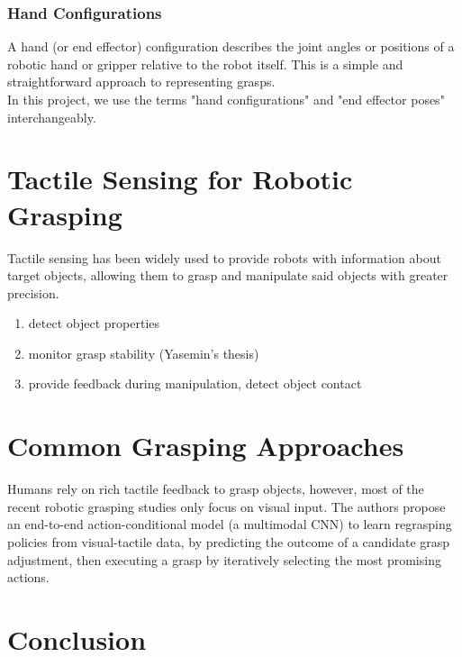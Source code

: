 \documentclass[11pt, a4paper]{report}
\begin{document}
\subsubsection{Hand Configurations}
\label{sec:2.1.1.3}
A hand (or end effector) configuration describes the joint angles or positions of a robotic hand or gripper relative to the robot itself. This is a simple and straightforward approach to representing grasps.\\

In this project, we use the terms "hand configurations" and "end effector poses" interchangeably.


\section{Tactile Sensing for Robotic Grasping}
\label{sec:2.2}
Tactile sensing has been widely used to provide robots with information about target objects, allowing them to grasp and manipulate said objects with greater precision.

\begin{enumerate}
    \item detect object properties
    \item monitor grasp stability (Yasemin's thesis)
    \item provide feedback during manipulation, detect object contact
\end{enumerate}


\section{Common Grasping Approaches}
\label{sec:2.3}
Humans rely on rich tactile feedback to grasp objects, however, most of the recent robotic grasping studies only focus on visual input. The authors propose an end-to-end action-conditional model (a multimodal CNN) to learn regrasping policies from visual-tactile data, by predicting the outcome of a candidate grasp adjustment, then executing a grasp by iteratively selecting the most promising actions\cite{Calandra_2018}.


\section{Conclusion}
\label{sec:2.4}


\end{document}
